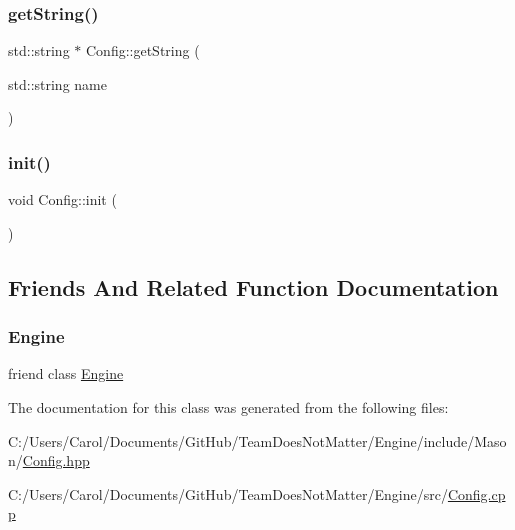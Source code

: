 \hypertarget{class_mason_1_1_config_abc367cc6194d049807fab3ff684996e3}{}\label{class_mason_1_1_config_abc367cc6194d049807fab3ff684996e3} 
\subsubsection{\texorpdfstring{get\+String()}{getString()}}
{\footnotesize\ttfamily std\+::string $\ast$ Config\+::get\+String (\begin{DoxyParamCaption}\item[{std\+::string}]{name }\end{DoxyParamCaption})\hspace{0.3cm}{\ttfamily [static]}}

\hypertarget{class_mason_1_1_config_a91bcb187ed95ec673137e413a4d77203}{}\label{class_mason_1_1_config_a91bcb187ed95ec673137e413a4d77203} 
\subsubsection{\texorpdfstring{init()}{init()}}
{\footnotesize\ttfamily void Config\+::init (\begin{DoxyParamCaption}{ }\end{DoxyParamCaption})\hspace{0.3cm}{\ttfamily [static]}}



\subsection{Friends And Related Function Documentation}
\hypertarget{class_mason_1_1_config_a3e1914489e4bed4f9f23cdeab34a43dc}{}\label{class_mason_1_1_config_a3e1914489e4bed4f9f23cdeab34a43dc} 
\subsubsection{\texorpdfstring{Engine}{Engine}}
{\footnotesize\ttfamily friend class \hyperlink{class_mason_1_1_engine}{Engine}\hspace{0.3cm}{\ttfamily [friend]}}



The documentation for this class was generated from the following files\+:\begin{DoxyCompactItemize}
\item 
C\+:/\+Users/\+Carol/\+Documents/\+Git\+Hub/\+Team\+Does\+Not\+Matter/\+Engine/include/\+Mason/\hyperlink{_config_8hpp}{Config.\+hpp}\item 
C\+:/\+Users/\+Carol/\+Documents/\+Git\+Hub/\+Team\+Does\+Not\+Matter/\+Engine/src/\hyperlink{_config_8cpp}{Config.\+cpp}\end{DoxyCompactItemize}
